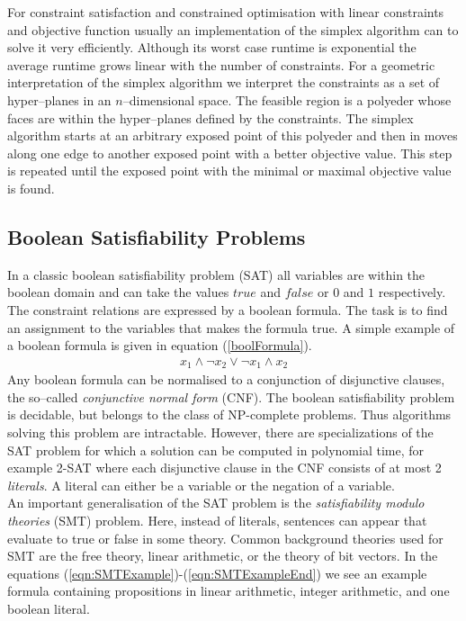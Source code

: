 For constraint satisfaction and constrained optimisation with linear constraints and objective function usually an implementation of the simplex algorithm \cite{dantzig63Simplex} can to solve it very efficiently. Although its worst case runtime is exponential the average runtime grows linear with the number of constraints. For a geometric interpretation of the simplex algorithm we interpret the constraints as a set of hyper--planes in an $n$--dimensional space. The feasible region is a polyeder whose faces are within the hyper--planes defined by the constraints. The simplex algorithm starts at an arbitrary exposed point of this polyeder and then in moves along one edge to another exposed point with a better objective value. This step is repeated until the exposed point with the minimal or maximal objective value is found.
\subsection{Boolean Satisfiability Problems}
\label{sec:MathBooleanSat}
In a classic boolean satisfiability problem (SAT) all variables are within the boolean domain and can take the values $true$ and $false$ or $0$ and $1$ respectively. The constraint relations are expressed by a boolean formula.  The task is to find an assignment to the variables that makes the formula true. A simple example of a boolean formula is given in equation (\ref{boolFormula}).
\begin{eqnarray}
x_1 \land \neg x_2  \lor \neg x_1 \land {x_2}
\label{boolFormula}
\end{eqnarray}
Any boolean formula can be normalised to a conjunction of disjunctive clauses, the so--called \emph{conjunctive normal form} (CNF). The boolean satisfiability problem is decidable, but belongs to the class of NP-complete problems. Thus algorithms solving this problem are intractable. However, there are specializations of the SAT problem for which a solution can be computed in polynomial time, for example 2-SAT where each disjunctive clause in the CNF consists of at most 2 \emph{literals}. A literal can either be a variable or the negation of a variable.\\
An important generalisation of the SAT problem is the \emph{satisfiability modulo theories} (SMT) problem. Here, instead of literals, sentences can appear that evaluate to true or false in some theory. Common background theories used for SMT are the free theory, linear arithmetic, or the theory of bit vectors. In the equations (\ref{eqn:SMTExample})-(\ref{eqn:SMTExampleEnd}) we see an example formula containing propositions in linear arithmetic, integer arithmetic, and one boolean literal.
